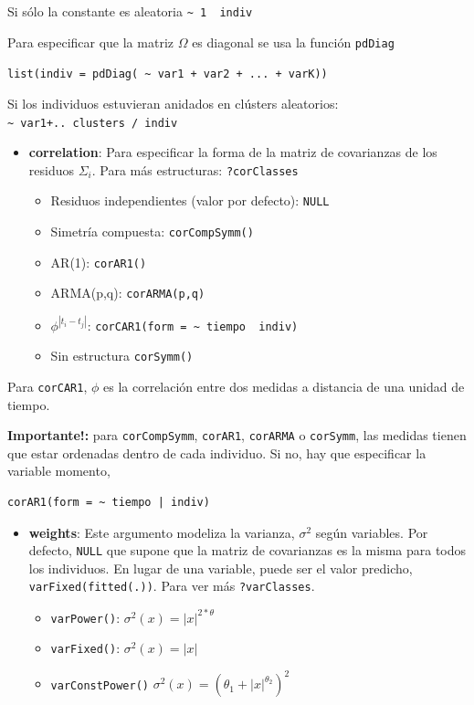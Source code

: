 \documentclass[
]{book}
\begin{document}
Si sólo la constante es aleatoria
\texttt{\textasciitilde{}\ 1\ \textbar{}\ indiv}

Para especificar que la matriz \(\Omega\) es diagonal se usa la función \texttt{pdDiag}

\texttt{list(indiv\ =\ pdDiag(\ \textasciitilde{}\ var1\ +\ var2\ +\ ...\ +\ varK))}

Si los individuos estuvieran anidados en clústers aleatorios:
\texttt{\textasciitilde{}\ var1+..\textbar{}\ clusters\ /\ indiv}

\begin{itemize}
\item
  \textbf{correlation}: Para especificar la forma de la matriz de covarianzas de los residuos \(\Sigma_i\). Para más estructuras: \texttt{?corClasses}

  \begin{itemize}
  \item
    Residuos independientes (valor por defecto): \texttt{NULL}
  \item
    Simetría compuesta: \texttt{corCompSymm()}
  \item
    AR(1): \texttt{corAR1()}
  \item
    ARMA(p,q): \texttt{corARMA(p,q)}
  \item
    \(\phi^{|t_i-t_j|}\): \texttt{corCAR1(form\ =\ \textasciitilde{}\ tiempo\ \textbar{}\ indiv)}
  \item
    Sin estructura \textbar{} \texttt{corSymm()}
  \end{itemize}
\end{itemize}

Para \texttt{corCAR1}, \(\phi\) es la correlación entre dos medidas a distancia de una unidad de tiempo.

\textbf{Importante!:} para \texttt{corCompSymm}, \texttt{corAR1}, \texttt{corARMA} o \texttt{corSymm}, las medidas tienen que estar ordenadas dentro de cada individuo. Si no, hay que especificar la variable momento,

\begin{verbatim}
corAR1(form = ~ tiempo | indiv)
\end{verbatim}

\begin{itemize}
\item
  \textbf{weights}: Este argumento modeliza la varianza, \(\sigma^2\) según variables. Por defecto, \texttt{NULL} que supone que la matriz de covarianzas es la misma para todos los individuos. En lugar de una variable, puede ser el valor predicho, \texttt{varFixed(fitted(.))}. Para ver más \texttt{?varClasses}.

  \begin{itemize}
  \item
    \texttt{varPower()}: \(\sigma^2(x) = |x|^{2*\theta}\)
  \item
    \texttt{varFixed()}: \(\sigma^2(x) = |x|\)
  \item
    \texttt{varConstPower()} \(\sigma^2(x) = (\theta_1 + |x|^{\theta_2})^2\)
  \end{itemize}
\end{itemize}
\end{document}
